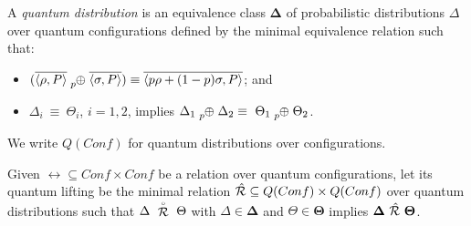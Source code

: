 \begin{definition}
	A \emph{quantum distribution} is an equivalence class $\mathbf{\Delta}$ of probabilistic distributions $\Delta$ over quantum configurations defined by the minimal equivalence relation such that:
	\begin{itemize}
		\item $(\overline{\confw{\rho, P}} \psum{p} \overline{\confw{\sigma, P}}) \equiv \overline{\confw{p \rho + (1-p)\sigma, P}}$; and
		\item $\Delta_i\ \equiv\ \Theta_i$, $i = 1, 2$, implies $\Delta_1 \psum{p} \Delta_2 \equiv\ \Theta_1 \psum{p} \Theta_2$.
	\end{itemize}
	We write $Q(Conf)$ for quantum distributions over configurations.
\end{definition}

\begin{definition}
	Given $\rel \subseteq Conf \times Conf$ be a relation over quantum configurations, let its quantum lifting be the minimal relation $\hat{\mathcal{R}} \subseteq Q(Conf) \times Q(Conf)$ over quantum distributions such that $\Delta\ \stackrel{\scriptscriptstyle \circ}{\mathcal{R}}\ \Theta$ with $\Delta \in \mathbf{\Delta}$ and $\Theta \in \mathbf{\Theta}$ implies $\mathbf{\Delta}\ \sqlift{\rel}\ \mathbf{\Theta}$.
\end{definition}




